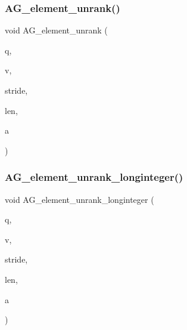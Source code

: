 \mbox{\label{projective_8_c_a4a33b86c87b2879b97cfa1327abe2885}} 
\subsubsection{\texorpdfstring{A\+G\+\_\+element\+\_\+unrank()}{AG\_element\_unrank()}}
{\footnotesize\ttfamily void A\+G\+\_\+element\+\_\+unrank (\begin{DoxyParamCaption}\item[{\mbox{\hyperlink{galois_8h_a09fddde158a3a20bd2dcadb609de11dc}{I\+NT}}}]{q,  }\item[{\mbox{\hyperlink{galois_8h_a09fddde158a3a20bd2dcadb609de11dc}{I\+NT}} $\ast$}]{v,  }\item[{\mbox{\hyperlink{galois_8h_a09fddde158a3a20bd2dcadb609de11dc}{I\+NT}}}]{stride,  }\item[{\mbox{\hyperlink{galois_8h_a09fddde158a3a20bd2dcadb609de11dc}{I\+NT}}}]{len,  }\item[{\mbox{\hyperlink{galois_8h_a09fddde158a3a20bd2dcadb609de11dc}{I\+NT}}}]{a }\end{DoxyParamCaption})}

\mbox{\label{projective_8_c_ab5a5ee4a58266d973534a63e72372c2d}} 
\subsubsection{\texorpdfstring{A\+G\+\_\+element\+\_\+unrank\+\_\+longinteger()}{AG\_element\_unrank\_longinteger()}}
{\footnotesize\ttfamily void A\+G\+\_\+element\+\_\+unrank\+\_\+longinteger (\begin{DoxyParamCaption}\item[{\mbox{\hyperlink{galois_8h_a09fddde158a3a20bd2dcadb609de11dc}{I\+NT}}}]{q,  }\item[{\mbox{\hyperlink{galois_8h_a09fddde158a3a20bd2dcadb609de11dc}{I\+NT}} $\ast$}]{v,  }\item[{\mbox{\hyperlink{galois_8h_a09fddde158a3a20bd2dcadb609de11dc}{I\+NT}}}]{stride,  }\item[{\mbox{\hyperlink{galois_8h_a09fddde158a3a20bd2dcadb609de11dc}{I\+NT}}}]{len,  }\item[{\mbox{\hyperlink{classlonginteger__object}{longinteger\+\_\+object}} \&}]{a }\end{DoxyParamCaption})}

